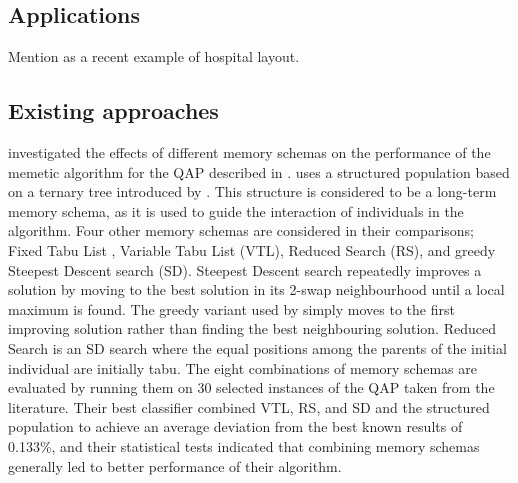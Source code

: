 \subsection{Applications} {
    \label{sec:applications}



    Mention \citep{XiongfengFeng:2015jo} as a recent example of hospital layout.

}

\subsection{Existing approaches} {
    \label{sec:approaches}




	\citet{Meneses:2011hg} investigated the effects of different memory schemas on the performance of the memetic algorithm for the QAP described in \citet{Inostroza:2008md}.
	\citeauthor{Meneses:2011hg} uses a structured population based on a ternary tree introduced by \citet{Inostroza:2008md}. This structure is considered to be a long-term memory schema, as it is used to guide the interaction of individuals in the algorithm.
	Four other memory schemas are considered in their comparisons; Fixed Tabu List \citep{glover1989tabu}, Variable Tabu List (VTL), Reduced Search (RS), and greedy Steepest Descent search (SD).
	Steepest Descent search repeatedly improves a solution by moving to the best solution in its 2-swap neighbourhood until a local maximum is found. The greedy variant used by \citeauthor{Meneses:2011hg} simply moves to the first improving solution rather than finding the best neighbouring solution.
	Reduced Search is an SD search where the equal positions among the parents of the initial individual are initially tabu.
	The eight combinations of memory schemas are evaluated by running them on 30 selected instances of the QAP taken from the literature.
	Their best classifier combined VTL, RS, and SD and the structured population to achieve an average deviation from the best known results of 0.133\%, and their statistical tests indicated that combining memory schemas generally led to better performance of their algorithm.


}

